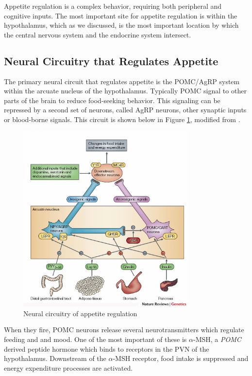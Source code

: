 \documentclass{tufte-handout}
\begin{document}
Appetite regulation is a complex behavior, requiring both peripheral and cognitive inputs.  The most important site for appetite regulation is within the hypothalamus, which as we discussed, is the most important location by which the central nervous system and the endocrine system intersect.  

\subsection{Neural Circuitry that Regulates Appetite}

The primary neural circuit that regulates appetite is the POMC/AgRP system within the arcuate nucleus of the hypothalamus.  Typically POMC signal to other parts of the brain to reduce food-seeking behavior.  This signaling can be repressed by a second set of neurons, called AgRP neurons, other synaptic inputs or blood-borne signals.  This circuit is shown below in Figure \ref{fig:agrp-pomc}, modified from \cite{Bell2005}.

\begin{figure}
\centering
  \includegraphics[width=0.8\textwidth]{figures/agrp-pomc}
  \caption{Neural circuitry of appetite regulation}
    \label{fig:agrp-pomc}
\end{figure}

When they fire, POMC neurons release several neurotransmitters which regulate feeding and and mood.  One of the most important of these is $\alpha$-MSH, a \textit{POMC} derived peptide hormone which binds to receptors in the PVN of the hypothalamus.  Downstream of the $\alpha$-MSH receptor, food intake is suppressed and energy expenditure processes are activated.
\end{document}
